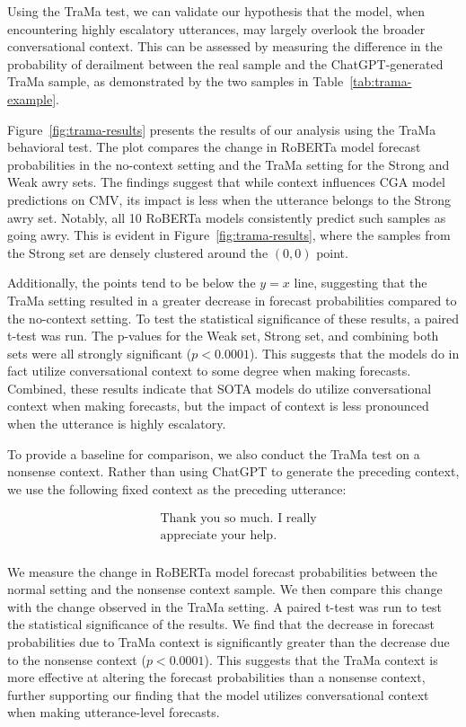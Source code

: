 Using the TraMa test, we can validate our hypothesis that the model, when encountering highly escalatory utterances, may largely overlook the broader conversational context. This can be assessed by measuring the difference in the probability of derailment between the real sample and the ChatGPT-generated TraMa sample, as demonstrated by the two samples in Table~\ref{tab:trama-example}. 

Figure~\ref{fig:trama-results} presents the results of our analysis using the TraMa behavioral test. 
The plot compares the change in RoBERTa model forecast probabilities in the no-context setting and the TraMa setting for the Strong and Weak awry sets.
The findings suggest that while context influences CGA model predictions on CMV, its impact is less when the utterance belongs to the Strong awry set. 
Notably, all 10 RoBERTa models consistently predict such samples as going awry. 
This is evident in Figure~\ref{fig:trama-results}, where the samples from the Strong set are densely clustered around the $(0, 0)$ point. 

Additionally, the points tend to be below the $y=x$ line, suggesting that the TraMa setting resulted in a greater decrease in forecast probabilities compared to the no-context setting. 
To test the statistical significance of these results, a paired t-test was run.
The p-values for the Weak set, Strong set, and combining both sets were all strongly significant ($p < 0.0001$). 
This suggests that the models do in fact utilize conversational context to some degree when making forecasts. 
Combined, these results indicate that SOTA models do utilize conversational context when making forecasts, but the impact of context is less pronounced when the utterance is highly escalatory.

To provide a baseline for comparison, we also conduct the TraMa test on a nonsense context.
Rather than using ChatGPT to generate the preceding context, we use the following fixed context as the preceding utterance: 

{\ttfamily
\begin{align*}
& \text{Thank you so much. I really}\\
& \text{appreciate your help.}\\
\end{align*}
}

We measure the change in RoBERTa model forecast probabilities between the normal setting and the nonsense context sample.
We then compare this change with the change observed in the TraMa setting. 
A paired t-test was run to test the statistical significance of the results.
We find that the decrease in forecast probabilities due to TraMa context is significantly greater than the decrease due to the nonsense context ($p < 0.0001$).
This suggests that the TraMa context is more effective at altering the forecast probabilities than a nonsense context, further supporting our finding that the model utilizes conversational context when making utterance-level forecasts.

